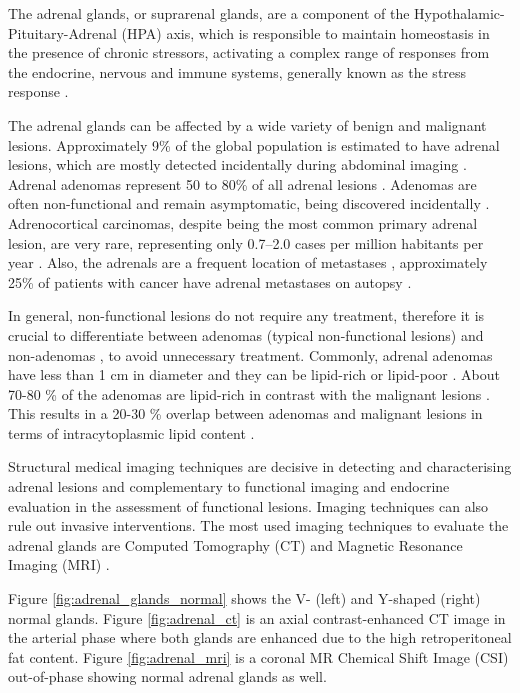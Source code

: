 \documentclass[11pt]{article}
\begin{document}
The adrenal glands, or suprarenal glands, are a component of the
Hypothalamic-Pituitary-Adrenal (HPA) axis, which is responsible to maintain
homeostasis in the presence of chronic stressors, activating a complex range of
responses from the endocrine, nervous and immune systems, generally known as the
stress response \cite{open}.

The adrenal glands can be affected by a wide variety of benign and malignant
lesions. Approximately 9\% of the global population is estimated to have adrenal
lesions, which are mostly detected incidentally during abdominal imaging
\cite{Dhamija2015}. Adrenal adenomas represent 50 to 80\% of all adrenal lesions
\cite{Bracci2022}.
Adenomas are often non-functional and remain asymptomatic, being discovered incidentally
\cite{Platzek2019}. Adrenocortical carcinomas, despite being the most common
primary adrenal lesion, are very rare, representing only 0.7–2.0 cases per million
habitants per year \cite{Bracci2022}.
Also, the adrenals are a frequent location of metastases \cite{Platzek2019},
approximately 25\% of patients with cancer have adrenal metastases on autopsy
\cite{Bracci2022}.

In general, non-functional lesions do not require any treatment, therefore it is
crucial to differentiate between adenomas (typical non-functional lesions) and
non-adenomas \cite{Platzek2019}, to avoid unnecessary treatment.
Commonly, adrenal adenomas have less than 1 cm in
diameter and they can be lipid-rich or lipid-poor \cite{Panda2015}.
About 70-80 \% of the adenomas are lipid-rich in contrast with the malignant
lesions \cite{Platzek2019}. This results in a 20-30 \% overlap between adenomas
and malignant lesions in terms of intracytoplasmic lipid content
\cite{Israel2004}.


Structural medical imaging techniques are decisive in detecting and
characterising adrenal lesions and complementary to functional imaging and
endocrine evaluation in the assessment of functional lesions. Imaging techniques
can also rule out invasive interventions. The most used imaging techniques to
evaluate the adrenal glands are Computed Tomography (CT) and Magnetic Resonance
Imaging (MRI) \cite{Panda2015}.

Figure \ref{fig:adrenal_glands_normal} shows the V- (left) and Y-shaped (right)
normal glands. Figure \ref{fig:adrenal_ct} is an axial contrast-enhanced CT
image in the arterial phase where both glands are enhanced due to the high
retroperitoneal fat content. Figure \ref{fig:adrenal_mri} is a coronal MR
Chemical Shift Image (CSI) out-of-phase showing normal adrenal glands as well.
\end{document}
